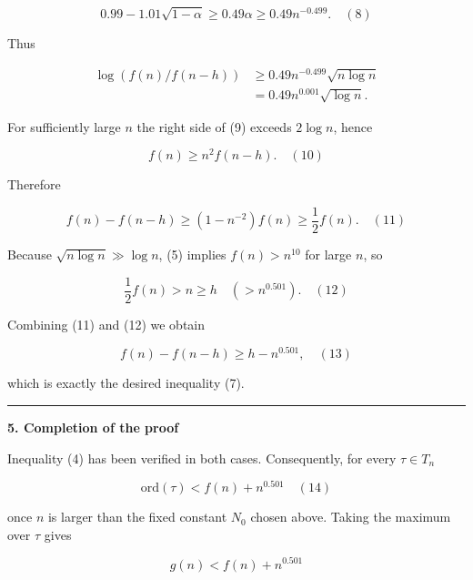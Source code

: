 \documentclass[12pt,a4paper]{article}
\theoremstyle{definition}
\begin{document}
    \begin{equation}
        0.99 - 1.01\sqrt{1-\alpha} \geq 0.49\alpha \geq 0.49 n^{-0.499}. \quad {(8)}
    \end{equation}

    Thus

    \begin{align}
        \log(f(n)/f(n-h)) &\geq 0.49 n^{-0.499}\sqrt{n \log n} \\
        &= 0.49 n^{0.001}\sqrt{\log n}. \tag{9}
    \end{align}

    For sufficiently large $n$ the right side of (9) exceeds $2 \log n$, hence

    \begin{equation}
        f(n) \geq n^2 f(n-h). \quad {(10)}
    \end{equation}

    Therefore

    \begin{equation}
        f(n) - f(n-h) \geq (1 - n^{-2})f(n) \geq \frac{1}{2} f(n). \quad {(11)}
    \end{equation}

    Because $\sqrt{n \log n} \gg \log n$, (5) implies $f(n) > n^{10}$ for large $n$, so

    \begin{equation}
        \frac{1}{2} f(n) > n \geq h \quad (> n^{0.501}). \quad {(12)}
    \end{equation}

    Combining (11) and (12) we obtain

    \begin{equation}
        f(n) - f(n-h) \geq h - n^{0.501}, \quad {(13)}
    \end{equation}

    which is exactly the desired inequality (7).

    \rule{\textwidth}{0.4pt}
    \textbf{5. Completion of the proof}

    Inequality (4) has been verified in both cases. Consequently, for
    every $\tau \in T_n$

    \begin{equation}
        \text{ord}(\tau) < f(n) + n^{0.501} \quad {(14)}
    \end{equation}

    once $n$ is larger than the fixed constant $N_0$ chosen above.
    Taking the maximum over $\tau$ gives

    \begin{equation*}
        g(n) < f(n) + n^{0.501}
    \end{equation*}
\end{document}

